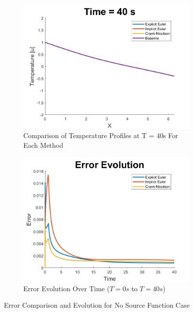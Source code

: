 \documentclass[10pt, letter, showtrims]{extarticle}
\begin{document}
		\FloatBarrier
		\begin{figure}[!h]
			\captionsetup[subfigure]{justification=centering}
			\centering
			
			\begin{subfigure}{.45\textwidth}
				\centering
				\includegraphics[width=1\linewidth]{"Figures/MATLAB/NoSourceCompare"}
				\caption{Comparison of Temperature Profiles at T = 40s For Each Method}
				\label{fig:compnosource}
			\end{subfigure}
			\begin{subfigure}{.45\textwidth}
				\centering
				\includegraphics[width=1\linewidth]{"Figures/MATLAB/NoSourceErrorTime"}
				\caption{Error Evolution Over Time ($T = 0s$ to $T = 40s$)}
				\label{fig:evolutionnosource}
			\end{subfigure}
			
			\caption{Error Comparison and Evolution for No Source Function Case}
			\label{fig:nosource}
		\end{figure}
		\FloatBarrier
		
\end{document}
